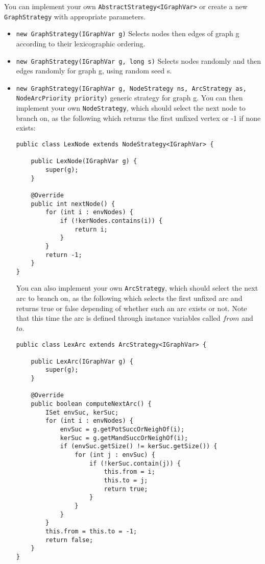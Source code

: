 \documentclass{article}
\begin{document}
You can implement your own \texttt{AbstractStrategy<IGraphVar>} or create a new \texttt{GraphStrategy} with appropriate parameters. 

\begin{itemize}
\item  \texttt{new GraphStrategy(IGraphVar g)} Selects nodes then edges of graph g according to their lexicographic ordering.
\item  \texttt{new GraphStrategy(IGraphVar g, long s)} Selects nodes randomly and then edges randomly for graph g, using random seed s. 
\item  \texttt{new GraphStrategy(IGraphVar g, NodeStrategy ns, ArcStrategy as, NodeArcPriority priority)} generic strategy for graph g. You can then implement your own \texttt{NodeStrategy}, which should select the next node to branch on, as the following which returns the first unfixed vertex or -1 if none exists: 

\begin{lstlisting}
public class LexNode extends NodeStrategy<IGraphVar> {

	public LexNode(IGraphVar g) {
		super(g);
	}

	@Override
	public int nextNode() {
		for (int i : envNodes) {
			if (!kerNodes.contains(i)) {
				return i;
			}
		}
		return -1;
	}
}
\end{lstlisting}

You can also implement your own \texttt{ArcStrategy}, which should select the next arc to branch on, as the following which selects the first unfixed arc and returns true or false depending of whether such an arc exists or not. 
Note that this time the arc is defined through instance variables called $from$ and $to$. 
\begin{lstlisting}
public class LexArc extends ArcStrategy<IGraphVar> {

	public LexArc(IGraphVar g) {
		super(g);
	}

	@Override
	public boolean computeNextArc() {
		ISet envSuc, kerSuc;
		for (int i : envNodes) {
			envSuc = g.getPotSuccOrNeighOf(i);
			kerSuc = g.getMandSuccOrNeighOf(i);
			if (envSuc.getSize() != kerSuc.getSize()) {
				for (int j : envSuc) {
					if (!kerSuc.contain(j)) {
						this.from = i;
						this.to = j;
						return true;
					}
				}
			}
		}
		this.from = this.to = -1;
		return false;
	}
}
\end{lstlisting}

\end{itemize}
\end{document}

